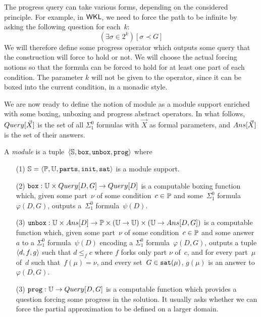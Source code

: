 The progress query can take various forms, depending on the considered principle. For example,
in $\operatorname{\sf{WKL}}$, we need to force the path to be infinite by asking the following question for each~$k$:
\[
(\exists \sigma \in 2^k)[\sigma \prec G]
\]
We will therefore define some progress operator which outputs some query that the construction
will force to hold or not. We will choose the actual forcing notions so that the formula
can be forced to hold for at least one part of each condition. The parameter $k$ will not be
given to the operator, since it can be boxed into the current condition, in a monadic style.


We are now ready to define the notion of module as a module support
enriched with some boxing, unboxing and progress abstract operators.
In what follows, $\mathop{Query}[\vec{X}]$ is the set of all $\Sigma^0_1$ formulas
with $\vec{X}$ as formal parameters, and $\mathop{Ans}[\vec{X}]$ is the set of their answers.

\begin{definition}[Module]
A \emph{module} is a tuple~$\left\langle \mathbb{S}, \mathtt{box}, \mathtt{unbox}, \mathtt{prog} \right\rangle$ where
\begin{itemize}
	\item[(1)] $\mathbb{S} = \left\langle \mathbb{P}, \mathbb{U}, \mathtt{parts}, \mathtt{init}, \mathtt{sat} \right\rangle$ is a module support.
	\item[(2)] $\mathtt{box} : \mathbb{U} \times \mathop{Query}[D,G] \to \mathop{Query}[D]$ is a computable boxing function which,
	given some part~$\nu$ of some condition~$c \in \mathbb{P}$ and some~$\Sigma^0_1$ formula~$\varphi(D,G)$,
	outputs a~$\Sigma^0_1$ formula~$\psi(D)$.
	\item[(3)] $\mathtt{unbox} : \mathbb{U} \times \mathop{Ans}[D] \to \mathbb{P} \times (\mathbb{U} \to \mathbb{U}) \times (\mathbb{U} \to \mathop{Ans}[D,G])$
	is a computable function which, given some part~$\nu$ of some condition~$c \in \mathbb{P}$
	and some answer~$a$ to a $\Sigma^0_1$ formula~$\psi(D)$ encoding a $\Sigma^0_1$ formula~$\varphi(D,G)$, 
	outputs a tuple $\left\langle d, f, g \right\rangle$ such that 
	$d \leq_f c$ where $f$ forks only part $\nu$ of~$c$,
	and for every part~$\mu$ of~$d$ such that~$f(\mu) = \nu$, 
		and every set~$G \in \mathtt{sat}(\mu)$, $g(\mu)$ is an answer to~$\varphi(D,G)$.
	\item[(3)] $\mathtt{prog} : \mathbb{U} \to \mathop{Query}[D,G]$ is a computable function which provides a question
	forcing some progress in the solution. It usually asks 
	whether we can force the partial approximation to be defined on a larger domain.
\end{itemize}
\end{definition}

